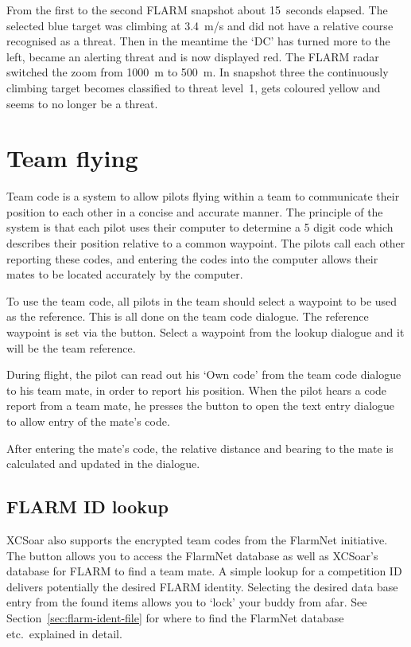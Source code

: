 From the first to the second FLARM snapshot about 15~seconds elapsed. The
selected blue target was climbing at 3.4~m/s and did not have a relative course
recognised as a threat.  Then in the meantime the `DC' has turned more to
the left, became an alerting threat and is now displayed red.  The FLARM
radar switched the zoom from 1000~m to 500~m. In snapshot three the
continuously climbing target becomes classified to threat level~1, gets
coloured yellow and seems to no longer be a threat.


\section{Team flying}\label{sec:team-flying}

Team code is a system to allow pilots flying within a team to 
communicate their position to each other in a concise and accurate 
manner.  The principle of the system is that each pilot uses their 
computer to determine a 5 digit code which describes their position 
relative to a common waypoint.  The pilots call each other reporting 
these codes, and entering the codes into the computer allows their 
mates to be located accurately by the computer. 

To use the team code, all pilots in the team should select a waypoint to 
be used as the reference.  This is all done on the team code dialogue. 
The reference waypoint is set 
via the  button. Select a waypoint from the lookup dialogue 
and it will be the team reference.

During flight, the pilot can read out his `Own code' from the team 
code dialogue to his team mate, in order to report his position.  When 
the pilot hears a code report from a team mate, he presses the  
button to open the text entry dialogue to allow entry of the mate's code.

After entering the mate's code, the relative distance and 
bearing to the mate is calculated and updated in the dialogue.


\subsection*{FLARM ID lookup}

XCSoar also supports the encrypted team codes from the FlarmNet initiative.
The  button allows you to access the FlarmNet database as well
as XCSoar's database for FLARM to find a team mate. A simple
lookup for a competition ID delivers potentially the desired 
FLARM identity. Selecting the desired data base entry from the found items allows you 
to `lock' your buddy from afar. See Section~\ref{sec:flarm-ident-file} for
where to find the FlarmNet database etc.\ explained in detail.

